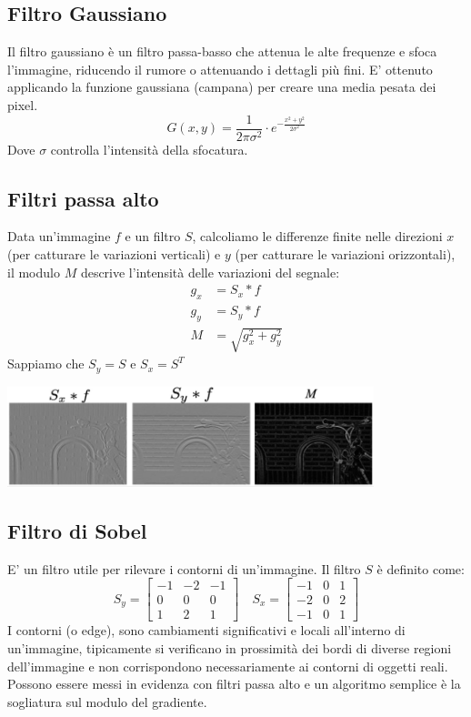\documentclass[12pt, a4paper]{report}
\begin{document}
\subsection{Filtro Gaussiano}
Il filtro gaussiano è un filtro passa-basso che attenua le alte frequenze e sfoca l'immagine, riducendo il rumore o attenuando i dettagli più fini. E' ottenuto applicando la funzione gaussiana (campana) per creare una media pesata dei pixel.
\begin{equation*}
    G(x,y) = \frac{1}{2\pi\sigma^{2}}\cdot e^{-\frac{x^{2}+y^{2}}{2\sigma^{2}}}
\end{equation*}
Dove $\sigma$ controlla l'intensità della sfocatura.
\subsection{Filtri passa alto}
Data un'immagine $f$ e un filtro $S$, calcoliamo le differenze finite nelle direzioni $x$ (per catturare le variazioni verticali) e $y$ (per catturare le variazioni orizzontali), il modulo $M$ descrive l'intensità delle variazioni del segnale:
\begin{equation*}
    \begin{split}
        g_{x} &= S_{x} * f \\
        g_{y} &= S_{y} * f \\
        M &= \sqrt{g_{x}^{2}+g_{y}^{2}}
    \end{split}
\end{equation*}
Sappiamo che $S_{y} = S$ e $S_{x}=S^{T}$
\begin{center}
    \includegraphics[width=0.8\textwidth]{Immagini/filtro2dpassaaalto.png}
\end{center}
\subsection{Filtro di Sobel}
E' un filtro utile per rilevare i contorni di un'immagine. Il filtro $S$ è definito come:
\begin{equation*}
    S_{y} = \begin{bmatrix}
        -1 & -2 & -1 \\
        0 & 0 & 0 \\
        1 & 2 & 1
    \end{bmatrix}
    \quad
    S_{x} = \begin{bmatrix}
        -1 & 0 & 1 \\
        -2 & 0 & 2 \\
        -1 & 0 & 1
    \end{bmatrix}
\end{equation*}
I contorni (o edge), sono cambiamenti significativi e locali all'interno di un'immagine, tipicamente si verificano in prossimità dei bordi di diverse regioni dell'immagine e non corrispondono necessariamente ai contorni di oggetti reali. Possono essere messi in evidenza con filtri passa alto e un algoritmo semplice è la sogliatura sul modulo del gradiente.
\end{document}
